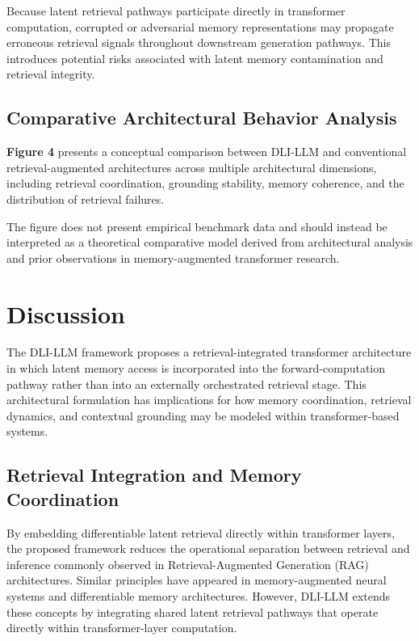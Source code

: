 \documentclass[
]{article}
\begin{document}
Because latent retrieval pathways participate directly in transformer
computation, corrupted or adversarial memory representations may
propagate erroneous retrieval signals throughout downstream generation
pathways. This introduces potential risks associated with latent memory
contamination and retrieval integrity.

\hypertarget{comparative-architectural-behavior-analysis}{%
\subsection{\texorpdfstring{ Comparative Architectural Behavior
Analysis}{ Comparative Architectural Behavior Analysis}}\label{comparative-architectural-behavior-analysis}}

\textbf{Figure 4} presents a conceptual comparison between DLI-LLM and
conventional retrieval-augmented architectures across multiple
architectural dimensions, including retrieval coordination, grounding
stability, memory coherence, and the distribution of retrieval failures.

The figure does not present empirical benchmark data and should instead
be interpreted as a theoretical comparative model derived from
architectural analysis and prior observations in memory-augmented
transformer research.

\hypertarget{discussion}{%
\section{Discussion}\label{discussion}}

The DLI-LLM framework proposes a retrieval-integrated transformer
architecture in which latent memory access is incorporated into the
forward-computation pathway rather than into an externally orchestrated
retrieval stage. This architectural formulation has implications for how
memory coordination, retrieval dynamics, and contextual grounding may be
modeled within transformer-based systems.

\hypertarget{retrieval-integration-and-memory-coordination}{%
\subsection{\texorpdfstring{ Retrieval Integration and Memory
Coordination}{ Retrieval Integration and Memory Coordination}}\label{retrieval-integration-and-memory-coordination}}

By embedding differentiable latent retrieval directly within transformer
layers, the proposed framework reduces the operational separation
between retrieval and inference commonly observed in Retrieval-Augmented
Generation (RAG) architectures. Similar principles have appeared in
memory-augmented neural systems and differentiable memory architectures.
However, DLI-LLM extends these concepts by integrating shared latent
retrieval pathways that operate directly within transformer-layer
computation.
\end{document}
